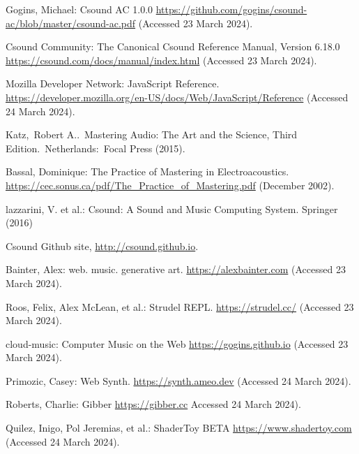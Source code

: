 \documentclass[runningheads,a4paper]{llncs}
\begin{document}
\begin{thebibliography}{4}
 Gogins, Michael: Csound AC 1.0.0 \url{https://github.com/gogins/csound-ac/blob/master/csound-ac.pdf} (Accessed 23 March 2024).

 Csound Community: The Canonical Csound Reference Manual, Version 6.18.0 \url{https://csound.com/docs/manual/index.html} (Accessed 23 March 2024).

 Mozilla Developer Network: JavaScript Reference. \url{https://developer.mozilla.org/en-US/docs/Web/JavaScript/Reference} (Accessed 24 March 2024).

 Katz, Robert A.. Mastering Audio: The Art and the Science, Third Edition. Netherlands: Focal Press (2015).

 Bassal, Dominique: The Practice of Mastering in Electroacoustics. \url{https://cec.sonus.ca/pdf/The\_Practice\_of\_Mastering.pdf} (December 2002).

 lazzarini, V. et al.: Csound: A Sound and Music Computing System.
Springer (2016)

 Csound Github site, \url{http://csound.github.io}.

 Bainter, Alex: web. music.
generative art. \url{https://alexbainter.com} (Accessed 23 March 2024).

 Roos, Felix, Alex McLean, et al.: Strudel REPL. \url{https://strudel.cc/} (Accessed 23 March 2024).

 cloud-music: Computer Music on the Web \url{https://gogins.github.io} (Accessed 23 March 2024).

 Primozic, Casey: Web Synth. \url{https://synth.ameo.dev} (Accessed 24 March 2024).
 
 Roberts, Charlie: Gibber \url{https://gibber.cc} Accessed 24 March 2024).

 Quilez, Inigo, Pol Jeremias, et al.: ShaderToy BETA \url{https://www.shadertoy.com} (Accessed 24 March 2024).

\end{thebibliography}
\end{document}
